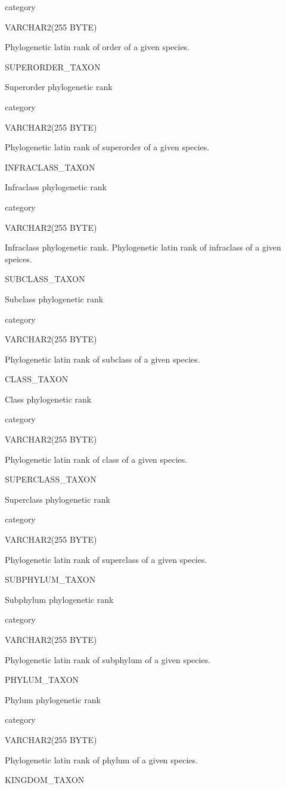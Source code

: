 \documentclass[
  letterpaper,
  oneside,
  open=any]{scrbook}
\begin{document}
category

VARCHAR2(255 BYTE)

Phylogenetic latin rank of order of a given species.

SUPERORDER\_TAXON

Superorder phylogenetic rank

category

VARCHAR2(255 BYTE)

Phylogenetic latin rank of superorder of a given species.

INFRACLASS\_TAXON

Infraclass phylogenetic rank

category

VARCHAR2(255 BYTE)

Infraclass phylogenetic rank. Phylogenetic latin rank of infraclass of a
given speices.

SUBCLASS\_TAXON

Subclass phylogenetic rank

category

VARCHAR2(255 BYTE)

Phylogenetic latin rank of subclass of a given species.

CLASS\_TAXON

Class phylogenetic rank

category

VARCHAR2(255 BYTE)

Phylogenetic latin rank of class of a given species.

SUPERCLASS\_TAXON

Superclass phylogenetic rank

category

VARCHAR2(255 BYTE)

Phylogenetic latin rank of superclass of a given species.

SUBPHYLUM\_TAXON

Subphylum phylogenetic rank

category

VARCHAR2(255 BYTE)

Phylogenetic latin rank of subphylum of a given species.

PHYLUM\_TAXON

Phylum phylogenetic rank

category

VARCHAR2(255 BYTE)

Phylogenetic latin rank of phylum of a given species.

KINGDOM\_TAXON
\end{document}
